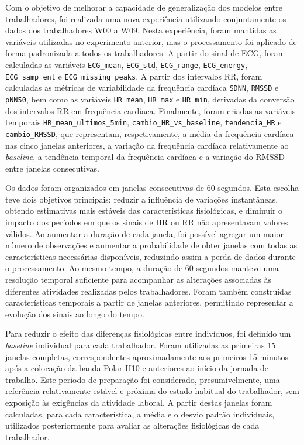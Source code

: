 Com o objetivo de melhorar a capacidade de generalização dos modelos entre trabalhadores, foi realizada uma nova experiência utilizando conjuntamente os dados dos trabalhadores W00 a W09. Nesta experiência, foram mantidas as variáveis utilizadas no experimento anterior, mas o processamento foi aplicado de forma padronizada a todos os trabalhadores. A partir do sinal de ECG, foram calculadas as variáveis \texttt{ECG\_mean}, \texttt{ECG\_std}, \texttt{ECG\_range}, \texttt{ECG\_energy}, \texttt{ECG\_samp\_ent} e \texttt{ECG\_missing\_peaks}. A partir dos intervalos RR, foram calculadas as métricas de variabilidade da frequência cardíaca \texttt{SDNN}, \texttt{RMSSD} e \texttt{pNN50}, bem como as variáveis \texttt{HR\_mean}, \texttt{HR\_max} e \texttt{HR\_min}, derivadas da conversão dos intervalos RR em frequência cardíaca. Finalmente, foram criadas as variáveis temporais \texttt{HR\_mean\_ultimos\_5min}, \texttt{cambio\_HR\_vs\_baseline}, \texttt{tendencia\_HR} e \texttt{cambio\_RMSSD}, que representam, respetivamente, a média da frequência cardíaca nas cinco janelas anteriores, a variação da frequência cardíaca relativamente ao \textit{baseline}, a tendência temporal da frequência cardíaca e a variação do RMSSD entre janelas consecutivas.

Os dados foram organizados em janelas consecutivas de 60 segundos. Esta escolha teve dois objetivos principais: reduzir a influência de variações instantâneas, obtendo estimativas mais estáveis das características fisiológicas, e diminuir o impacto dos períodos em que os sinais de HR ou RR não apresentavam valores válidos. Ao aumentar a duração de cada janela, foi possível agregar um maior número de observações e aumentar a probabilidade de obter janelas com todas as características necessárias disponíveis, reduzindo assim a perda de dados durante o processamento. Ao mesmo tempo, a duração de 60 segundos manteve uma resolução temporal suficiente para acompanhar as alterações associadas às diferentes atividades realizadas pelos trabalhadores. Foram também construídas características temporais a partir de janelas anteriores, permitindo representar a evolução dos sinais ao longo do tempo.

Para reduzir o efeito das diferenças fisiológicas entre indivíduos, foi definido um \textit{baseline} individual para cada trabalhador. Foram utilizadas as primeiras 15 janelas completas, correspondentes aproximadamente aos primeiros 15 minutos após a colocação da banda Polar H10 e anteriores ao início da jornada de trabalho. Este período de preparação foi considerado, presumivelmente, uma referência relativamente estável e próxima do estado habitual do trabalhador, sem exposição às exigências da atividade laboral. A partir destas janelas foram calculadas, para cada característica, a média e o desvio padrão individuais, utilizados posteriormente para avaliar as alterações fisiológicas de cada trabalhador.

